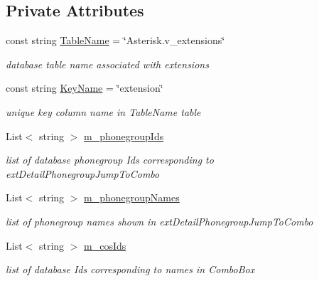 \subsection*{Private Attributes}
\begin{DoxyCompactItemize}
\item 
const string \hyperlink{class_ias_pbx_config_1_1_extension_details_ab856c6ba9e3e93e697ea9228b3f39bf7}{TableName} = \char`\"{}Asterisk.v\_\-extensions\char`\"{}
\begin{DoxyCompactList}\small\item\em database table name associated with extensions \item\end{DoxyCompactList}\item 
const string \hyperlink{class_ias_pbx_config_1_1_extension_details_ab5577b60085bb47be22b3c90c3e0fe04}{KeyName} = \char`\"{}extension\char`\"{}
\begin{DoxyCompactList}\small\item\em unique key column name in TableName table \item\end{DoxyCompactList}\item 
List$<$ string $>$ \hyperlink{class_ias_pbx_config_1_1_extension_details_a1f41108381e37e3226b3327478bdc5d5}{m\_\-phonegroupIds}
\begin{DoxyCompactList}\small\item\em list of database phonegroup Ids corresponding to extDetailPhonegroupJumpToCombo \item\end{DoxyCompactList}\item 
List$<$ string $>$ \hyperlink{class_ias_pbx_config_1_1_extension_details_a6434f33b3ac74f89fd3b13b228bd38d4}{m\_\-phonegroupNames}
\begin{DoxyCompactList}\small\item\em list of phonegroup names shown in extDetailPhonegroupJumpToCombo \item\end{DoxyCompactList}\item 
List$<$ string $>$ \hyperlink{class_ias_pbx_config_1_1_extension_details_af25b0209f111193cbabc39fdbb01bbb5}{m\_\-cosIds}
\begin{DoxyCompactList}\small\item\em list of database Ids corresponding to names in ComboBox \item\end{DoxyCompactList}\item 

\end{DoxyCompactItemize}
